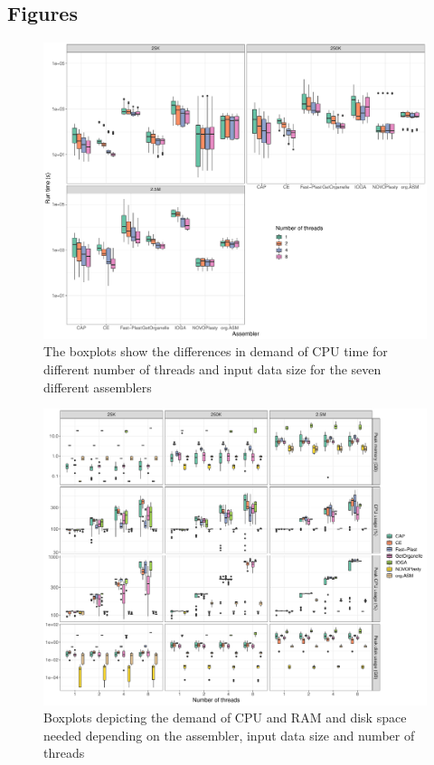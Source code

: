 \documentclass{bmcart}
\begin{document}
\begin{backmatter}
\section*{Figures}
\begin{figure}[h!]
  \includegraphics[width=\textwidth]{comp_time_log.pdf}
  \caption{
  The boxplots show the differences in demand of CPU time for different number of threads and input data size for the seven different assemblers
  }
        \label{fig:performance_runtime}
      \end{figure}

\begin{figure}[h!]
  \includegraphics[width=\textwidth]{usage_amount_threads.pdf}
  \caption{
      Boxplots depicting the demand of CPU and RAM and disk space needed depending on the assembler, input data size and number of threads}
      \label{fig:performance_memory_cpu}
      \end{figure}


\end{backmatter}
\end{document}
